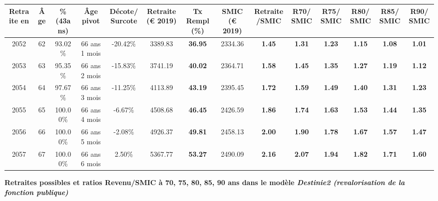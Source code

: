 \begin{adjustbox}{max width=\textwidth} 
\begin{tabular}[htb]{|c|c||c|c|c||c|c||c|c||c|c|c|c|c|} 
\hline 
 Retraite en &  Âge &  \%(43ans) &  Âge pivot &  Décote/Surcote &  Retraite (\euro{} 2019) &  Tx Rempl(\%) &  SMIC (\euro{} 2019) &  Retraite/SMIC &  R70/SMIC &  R75/SMIC &  R80/SMIC &  R85/SMIC &  R90/SMIC \\ 
\hline \hline 
 2052 &  62 &  93.02\% &  66 ans 1 mois &  -20.42\% &  3389.83 &  {\bf 36.95} &  2334.36 &  {\bf 1.45} &  {\bf 1.31} &  {\bf 1.23} &  {\bf 1.15} &  {\bf 1.08} &  {\bf 1.01} \\ 
\hline 
 2053 &  63 &  95.35\% &  66 ans 2 mois &  -15.83\% &  3741.19 &  {\bf 40.02} &  2364.71 &  {\bf 1.58} &  {\bf 1.45} &  {\bf 1.35} &  {\bf 1.27} &  {\bf 1.19} &  {\bf 1.12} \\ 
\hline 
 2054 &  64 &  97.67\% &  66 ans 3 mois &  -11.25\% &  4113.89 &  {\bf 43.19} &  2395.45 &  {\bf 1.72} &  {\bf 1.59} &  {\bf 1.49} &  {\bf 1.40} &  {\bf 1.31} &  {\bf 1.23} \\ 
\hline 
 2055 &  65 &  100.00\% &  66 ans 4 mois &  -6.67\% &  4508.68 &  {\bf 46.45} &  2426.59 &  {\bf 1.86} &  {\bf 1.74} &  {\bf 1.63} &  {\bf 1.53} &  {\bf 1.44} &  {\bf 1.35} \\ 
\hline 
 2056 &  66 &  100.00\% &  66 ans 5 mois &  -2.08\% &  4926.37 &  {\bf 49.81} &  2458.13 &  {\bf 2.00} &  {\bf 1.90} &  {\bf 1.78} &  {\bf 1.67} &  {\bf 1.57} &  {\bf 1.47} \\ 
\hline 
 2057 &  67 &  100.00\% &  66 ans 6 mois &  2.50\% &  5367.77 &  {\bf 53.27} &  2490.09 &  {\bf 2.16} &  {\bf 2.07} &  {\bf 1.94} &  {\bf 1.82} &  {\bf 1.71} &  {\bf 1.60} \\ 
\hline 
\hline 
\end{tabular} 
\end{adjustbox} 
 
 \vspace{0.1cm} 
{\bf \noindent Retraites possibles et ratios Revenu/SMIC à 70, 75, 80, 85, 90 ans dans le modèle \emph{Destinie2 (revalorisation de la fonction publique)}}  
 
